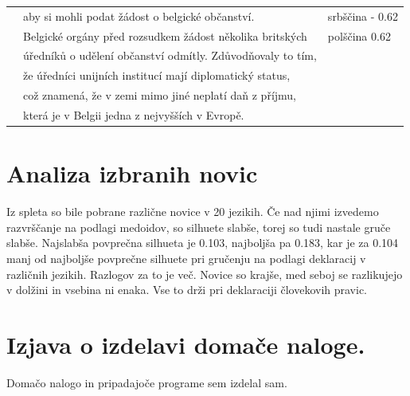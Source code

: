 \documentclass[a4paper,11pt]{article}
\begin{document}
\begin{table}[htbp]
\begin{center}
\begin{tabular}{llp{3cm}}
			 & aby si mohli podat žádost o belgické občanství. & srbščina - 0.62\\
			 & Belgické orgány před rozsudkem žádost několika britských & polščina 0.62\\
			 & úředníků o udělení občanství odmítly. Zdůvodňovaly to tím, & \\
			 & že úředníci unijních institucí mají diplomatický status, & \\
			 & což znamená, že v zemi mimo jiné neplatí daň z příjmu, & \\
			 & která je v Belgii jedna z nejvyšších v Evropě. & \\
			\hline
		\end{tabular}
	\end{center}
\end{table}

\pagebreak

\section{Analiza izbranih novic}
Iz spleta so bile pobrane različne novice v 20 jezikih. Če nad njimi izvedemo razvrščanje na podlagi medoidov, so silhuete slabše, torej so tudi nastale gruče slabše. Najslabša povprečna silhueta je 0.103, najboljša pa 0.183, kar je za 0.104 manj od najboljše povprečne silhuete pri gručenju na podlagi deklaracij v različnih jezikih. Razlogov za to je več. Novice so krajše, med seboj se razlikujejo v dolžini in vsebina ni enaka. Vse to drži pri deklaraciji človekovih pravic.  

\section{Izjava o izdelavi domače naloge.}
Domačo nalogo in pripadajoče programe sem izdelal sam.
\end{document}
